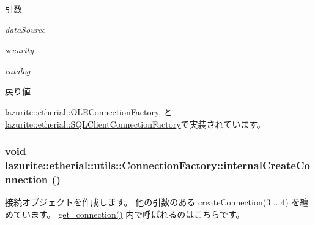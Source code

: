 \begin{DoxyParams}{引数}
\item[{\em dataSource}]\item[{\em security}]\item[{\em catalog}]\end{DoxyParams}
\begin{DoxyReturn}{戻り値}

\end{DoxyReturn}


\hyperlink{classlazurite_1_1etherial_1_1_o_l_e_connection_factory_a9c06016911fd6228fa86d6d458a82445}{lazurite::etherial::OLEConnectionFactory}, と \hyperlink{classlazurite_1_1etherial_1_1_s_q_l_client_connection_factory_ae90709eac75512aafebd8d81290e8100}{lazurite::etherial::SQLClientConnectionFactory}で実装されています。\hypertarget{classlazurite_1_1etherial_1_1utils_1_1_connection_factory_a65f9c1c53f6a6897b30534a024b97150}{
\subsubsection[{internalCreateConnection}]{\setlength{\rightskip}{0pt plus 5cm}void lazurite::etherial::utils::ConnectionFactory::internalCreateConnection ()}}
\label{classlazurite_1_1etherial_1_1utils_1_1_connection_factory_a65f9c1c53f6a6897b30534a024b97150}


接続オブジェクトを作成します。 他の引数のある createConnection(3 .. 4) を纏めています。 \hyperlink{classlazurite_1_1etherial_1_1utils_1_1_connection_factory_ad490aef8cd59c68131fe40a92cd3261b}{get\_\-connection()} 内で呼ばれるのはこちらです。 

